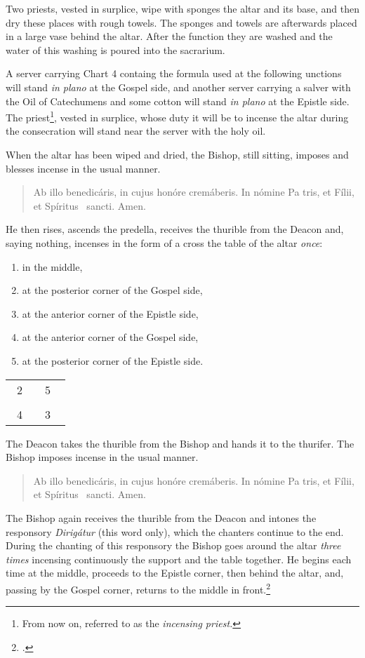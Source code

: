 \documentclass[letterpaper]{report}
\newcommand\blessincense{
\begin{quote}
   Ab illo benedicáris, in cujus honóre cremáberis. In nómine Pa\cross
    tris, et Fí\cross lii, et Spíritus \cross\ sancti. \rbar Amen.
\end{quote}
}
\newcommand\crossplan{
\begin{center}
    \begin{tabular}{ | l c r | }
       \hline
        \cross\ {\tiny 2} &         & {\tiny 5} \cross\ \\
                           & \cross &           \\
        \cross\ {\tiny 4} &         & {\tiny 3} \cross\ \\
       \hline
   \end{tabular} 
\end{center}
}
\begin{document}
{    \rubric Two priests, vested in surplice, wipe with sponges the altar and
    its base, and then dry these places with rough towels. The sponges and
    towels are afterwards placed in a large vase behind the altar. After the
    function they are washed and the water of this washing is poured into the
    sacrarium.

    \rubric A server carrying Chart 4 containg the formula used at the
    following unctions will stand \textit{in plano} at the Gospel side, and
    another server carrying a salver with the Oil of Catechumens and some
    cotton will stand \textit{in plano} at the Epistle side. The
    priest\footnote{From now on, referred to as the \textit{incensing
    priest.}}, vested in surplice, whose duty it will be to incense the altar
    during the consecration will stand near the server with the holy oil.

    \rubric When the altar has been wiped and dried, the Bishop, still sitting,
    imposes and blesses incense in the usual manner. 

    \blessincense

    He then rises, ascends the predella, receives the thurible from the Deacon
    and, saying nothing, incenses in the form of a cross the table of the altar
    \textit{once}: 

    \begin{enumerate}
        \item in the middle,
        \item at the posterior corner of the Gospel side,
        \item at the anterior corner of the Epistle side,
        \item at the anterior corner of the Gospel side,
        \item at the posterior corner of the Epistle side.
    \end{enumerate}

    \crossplan

    \rubric The Deacon takes the thurible from the Bishop and hands it to the
    thurifer. The Bishop imposes incense in the usual manner.

    \blessincense

    The Bishop again receives the thurible from the Deacon and intones the
    responsory \textit{Dirig\'atur} (this word only), which the chanters
    continue to the end. During the chanting of this responsory the Bishop goes
    around the altar \textit{three times} incensing continuously the support
    and the table together. He begins each time at the middle, proceeds to the
    Epistle corner, then behind the altar, and, passing by the Gospel corner,
    returns to the middle in front.\footcite[If the back of the altar is
    attached to the wall, he begins at the middle, incenses the support as fas
    as the Epistle corner, afterwards the table from the Epistle to the Gospel
    side, then the side of the altar at the Gospel side, then the side of the
    altar at the Gospel corner and finally the support from the Gospel corner
    to the middle.][footnote 1, p. 96.]{consecranda}

}
\end{document}
